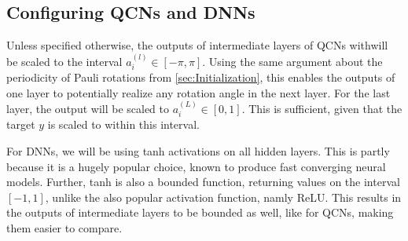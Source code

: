 \subsection{Configuring QCNs and DNNs}\label{sec:Configuring QCNs and DNNs}
Unless specified otherwise, the outputs of intermediate layers of QCNs withwill be scaled to the interval $a_i^{(l)} \in [-\pi, \pi]$. Using the same argument about the periodicity of Pauli rotations from \autoref{sec:Initialization}, this enables the outputs of one layer to potentially realize any rotation angle in the next layer. For the last layer, the output will be scaled to $a_i^{(L)} \in [0, 1]$. This is sufficient, given that the target $y$ is scaled to within this interval. 

For DNNs, we will be using tanh activations on all hidden layers. This is partly because it is a hugely popular choice, known to produce fast converging neural models\cite{hands-on}. Further, tanh is also a bounded function, returning values on the interval $[-1, 1]$, unlike the also popular activation function, namly ReLU. This results in the outputs of intermediate layers to be bounded as well, like for QCNs, making them easier to compare.





















